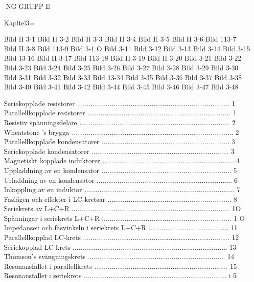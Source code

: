 NG
GRUPP Il

Kapitel3=

Bild II 3-1
Bild II 3-2
Bild II 3-3
Bild II 3-4
Bild II 3-5
Bild II 3-6
Bild 113-7
Bild II 3-8
Bild 113-9
Bild 3-1 O
Bild 3-11
Bild 3-12
Bild 3-13
Bild 3-14
Bild 3-15
Bild 13-16
Bild II 3-17
Bild 113-18
Bild II 3-19
Bild II 3-20
Bild 3-21
Bild 3-22
Bild 3-23
Bild 3-24
Bild 3-25
Bild 3-26
Bild 3-27
Bild 3-28
Bild 3-29
Bild 3-30
Bild 3-31
Bild 3-32
Bild 3-33
Bild 13-34
Bild 3-35
Bild 3-36
Bild 3-37
Bild 3-38
Bild 3-40
Bild 3-41
Bild 3-42
Bild 3-44
Bild 3-45
Bild 3-46
Bild 3-47
Bild 3-48

Seriekopplade resistorer ................................................................................ 1
Parallellkopplade resistorer ........................................................................... 1
Resistiv spänningsdelare ............................................................................... 2
Wheatstone 's brygga ..................................................................................... 2
Parallellkopplade kondensatorer ................................................................... 3
Seriekopplade kondensatorer ........................................................................ 3
Magnetiskt kopplade induktorer ..................................................................... 4
Uppladdning av en kondensator .................................................................... 5
Urladdning av en kondensator ....................................................................... 6
Inkoppling av en induktor ............................................................................... 7
Faslägen och effekter i LC-kretsar ................................................................. 8
Seriekrets av L+C+R ................................................................................... 1O
Spänningar i seriekrets L+C+R .................................................................... 1 O
Impedansen och fasvinkeln i seriekrets L+C+R .......................................... 11
Parallellkopplad LC-krets ............................................................................. 12
Seriekopplad LC-krets ................................................................................. 13
Thomson's svängningskrets ........................................................................ 14
Resonansfallet i parallellkrets ...................................................................... 15
Resonansfallet i seriekrets ........................................................................... i 5

